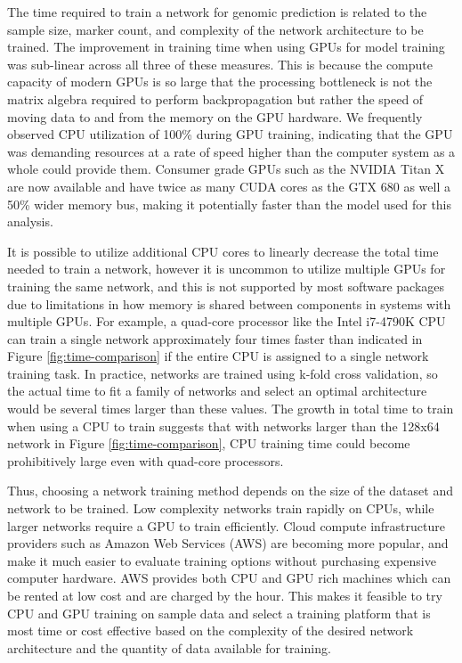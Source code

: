 The time required to train a network for genomic prediction is related to
the sample size, marker count, and complexity of the network architecture to be trained.
The improvement in training time when using GPUs for model training was sub-linear across 
all three of these measures. This is because the compute capacity of modern GPUs is 
so large that the processing bottleneck is not the matrix algebra required 
to perform backpropagation but rather the speed of moving data to and from 
the memory on the GPU hardware. We frequently observed CPU utilization of 
100\% during GPU training, indicating that the GPU was demanding resources
at a rate of speed higher than the computer system as a whole could provide them.
Consumer grade GPUs such as the NVIDIA Titan X are now available and have twice 
as many CUDA cores as the GTX 680 as well a 50\% wider memory bus, making it potentially
faster than the model used for this analysis. 

It is possible to utilize additional CPU cores to linearly decrease the total time 
needed to train a network, however it is uncommon to utilize multiple GPUs for 
training the same network, and this is not supported by most software packages 
due to limitations in how memory is shared between components in systems with 
multiple GPUs. For example, a quad-core processor like the Intel i7-4790K CPU 
can train a single network approximately four times faster than indicated in 
Figure \ref{fig:time-comparison} if the entire CPU is assigned to a single
network training task. In practice, networks are trained using k-fold
cross validation, so the actual time to fit a family of networks and select
an optimal architecture would be several times larger than these values.
The growth in total time to train when using a CPU to train suggests that with 
networks larger than the 128x64 network in Figure \ref{fig:time-comparison}, 
CPU training time could become prohibitively large even with quad-core processors. 

Thus, choosing a network training method depends on the size of the dataset and network
to be trained. Low complexity networks train rapidly on CPUs, while larger networks
require a GPU to train efficiently. Cloud compute infrastructure providers such 
as Amazon Web Services (AWS) are becoming more popular, and make it much easier
to evaluate training options without purchasing expensive computer hardware.
AWS provides both CPU and GPU rich machines which can be rented at low cost 
and are charged by the hour. This makes it feasible to try CPU and GPU training
on sample data and select a training platform that is most time or cost effective based on the 
complexity of the desired network architecture and the quantity of data available
for training. 

